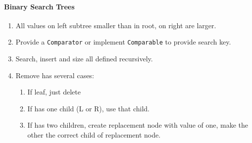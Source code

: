 \documentclass[twocolumn,english]{article}
\begin{document}
\paragraph{Binary Search Trees}
\begin{enumerate}
\item All values on left subtree smaller than in root, on right are larger.
\item Provide a \texttt{Comparator} or implement \texttt{Comparable} to
provide search key.
\item Search, insert and size all defined recursively.
\item Remove has several cases:

\begin{enumerate}
\item If leaf, just delete
\item If has one child (L or R), use that child.
\item If has two children, create replacement node with value of one, make
the other the correct child of replacement node.
\end{enumerate}
\end{enumerate}
\end{document}
